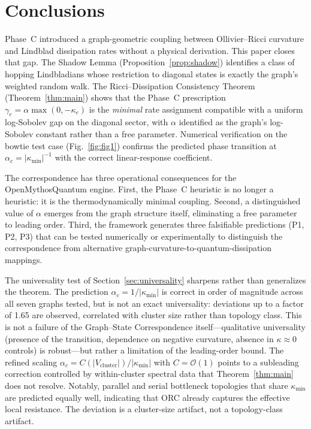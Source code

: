 \documentclass[11pt,letterpaper]{article}
\theoremstyle{definition}
\theoremstyle{remark}
\begin{document}
\section{Conclusions}
\label{sec:conclusions}

Phase~C introduced a graph-geometric coupling between Ollivier--Ricci
curvature and Lindblad dissipation rates without a physical derivation.
This paper closes that gap. The Shadow Lemma (Proposition~\ref{prop:shadow})
identifies a class of hopping Lindbladians whose restriction to diagonal
states is exactly the graph's weighted random walk. The Ricci--Dissipation
Consistency Theorem (Theorem~\ref{thm:main}) shows that the
Phase~C prescription $\gamma_e = \alpha\max(0,-\kappa_e)$ is the \emph{minimal}
rate assignment compatible with a uniform log-Sobolev gap on the diagonal
sector, with $\alpha$ identified as the graph's log-Sobolev constant rather
than a free parameter. Numerical verification on the bowtie test case
(Fig.~\ref{fig:fig1}) confirms the predicted phase transition at
$\alpha_c = |\kappa_{\mathrm{min}}|^{-1}$ with the correct linear-response
coefficient.

The correspondence has three operational consequences for the
OpenMythosQuantum engine. First, the Phase~C heuristic is no longer a
heuristic: it is the thermodynamically minimal coupling. Second, a distinguished
value of $\alpha$ emerges from the graph structure itself, eliminating a
free parameter to leading order. Third, the framework generates three
falsifiable predictions (P1, P2, P3) that can be tested numerically or
experimentally to distinguish the correspondence from alternative
graph-curvature-to-quantum-dissipation mappings.

The universality test of Section~\ref{sec:universality} sharpens rather
than generalizes the theorem. The prediction $\alpha_c = 1/|\kappa_{\min}|$
is correct in order of magnitude across all seven graphs tested, but is not
an exact universality: deviations up to a factor of 1.65 are observed,
correlated with cluster size rather than topology class. This is not a
failure of the Graph--State Correspondence itself---qualitative universality
(presence of the transition, dependence on negative curvature, absence in
$\kappa\approx 0$ controls) is robust---but rather a limitation of the
leading-order bound. The refined scaling $\alpha_c = C(|V_{\mathrm{cluster}}|)/|\kappa_{\min}|$
with $C = \mathcal{O}(1)$ points to a subleading correction controlled by
within-cluster spectral data that Theorem~\ref{thm:main} does not resolve.
Notably, parallel and serial bottleneck topologies that share $\kappa_{\min}$
are predicted equally well, indicating that ORC already captures the effective
local resistance. The deviation is a cluster-size artifact, not a topology-class
artifact.
\end{document}
